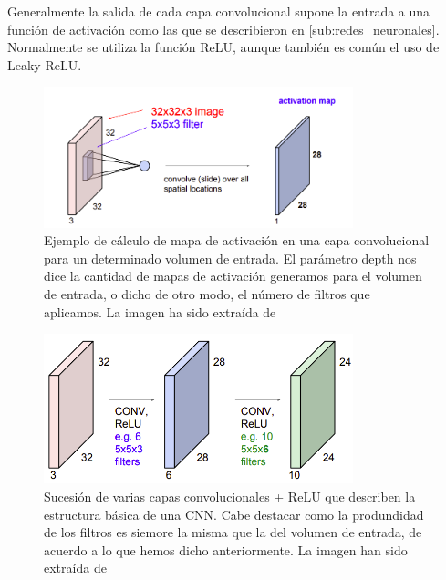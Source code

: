             \noindent Generalmente la salida de cada capa convolucional supone la entrada a una función de activación como las que se describieron en \autoref{sub:redes_neuronales}. Normalmente se utiliza la función ReLU, aunque también es común el uso de Leaky ReLU.

            \begin{figure}[!h]
                \centering
                \includegraphics[width=0.8\textwidth]{img/mapa_activacion.png}
                \caption{Ejemplo de cálculo de mapa de activación en una capa convolucional para un determinado volumen de entrada. El parámetro depth nos dice la cantidad de mapas de activación generamos para el volumen de entrada, o dicho de otro modo, el número de filtros que aplicamos. La imagen ha sido extraída de \cite{StanfordCourse}}
                \label{fig:mapa_activacion}
            \end{figure}

            \begin{figure}[!h]
                \centering
                \includegraphics[width=0.8\textwidth]{img/sucesion_conv_layer.png}
                \caption{Sucesión de varias capas convolucionales + ReLU que describen la estructura básica de una CNN. Cabe destacar como la produndidad de los filtros es siemore la misma que la del volumen de entrada, de acuerdo a lo que hemos dicho anteriormente. La imagen han sido extraída de \cite{StanfordCourse}}
                \label{fig:estructura_convnet}
            \end{figure}

